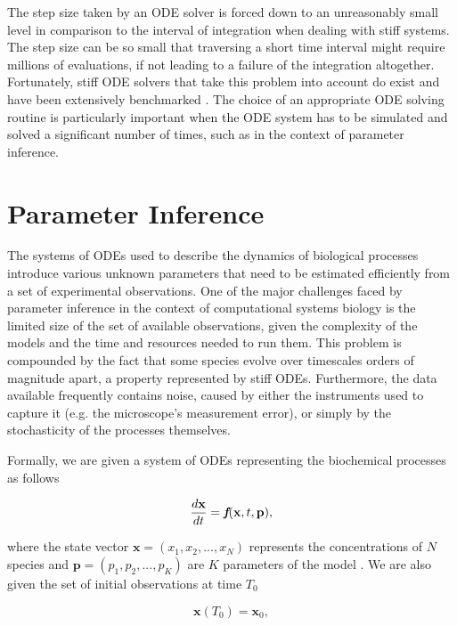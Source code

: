 \documentclass[bsc,frontabs,singlespacing,parskip,deptreport]{infthesis}
\begin{document}
The step size taken by an ODE solver is forced down to an unreasonably small level in comparison to the interval of integration when dealing with stiff systems. The step size can be so small that traversing a short time interval might require millions of evaluations, if not leading to a failure of the integration altogether. Fortunately, stiff ODE solvers that take this problem into account do exist and have been extensively benchmarked \cite{Stadter2021}. The choice of an appropriate ODE solving routine is particularly important when the ODE system has to be simulated and solved a significant number of times, such as in the context of parameter inference.





\section{Parameter Inference}\label{sec:param_inference}
The systems of ODEs used to describe the dynamics of biological processes introduce various unknown parameters that need to be estimated efficiently from a set of experimental observations. One of the major challenges faced by parameter inference in the context of computational systems biology is the limited size of the set of available observations, given the complexity of the models and the time and resources needed to run them. This problem is compounded by the fact that some species evolve over timescales orders of magnitude apart, a property represented by stiff ODEs. Furthermore, the data available frequently contains noise, caused by either the instruments used to capture it (e.g. the microscope's measurement error), or simply by the stochasticity of the processes themselves.

Formally, we are given a system of ODEs representing the biochemical processes as follows

\begin{equation}
    \frac{d\textbf{x}}{dt} = \textit{\textbf{f}}(\textbf{x}, t, \textbf{p}),
\end{equation}

where the state vector $\textbf{x} = (x_{1}, x_{2}, ..., x_{N})$ represents the concentrations of $N$ species and $\textbf{p} = (p_{1}, p_{2}, ..., p_{K})$ are $K$ parameters of the model \cite{pmid33206658}. We are also given the set of initial observations at time $T_{0}$

\begin{equation}
    \textbf{x}(T_{0}) = \textbf{x}_{0},
\end{equation}
\end{document}
